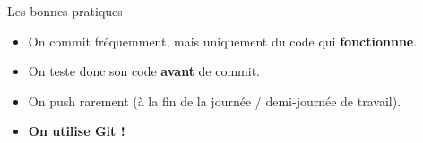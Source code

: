 \documentclass[presentation]{beamer}
\begin{document}
\begin{frame}{Les bonnes pratiques}
\begin{itemize}
	\item<1-4> On commit fréquemment, mais uniquement du code qui \textbf{fonctionnne}.
	\item<2-4> On teste donc son code \textbf{avant} de commit.
	\item<3-4> On push rarement (à la fin de la journée / demi-journée de travail).
	\item<4> \textbf{On utilise Git !}
\end{itemize}
	
\end{frame}
\end{document}
